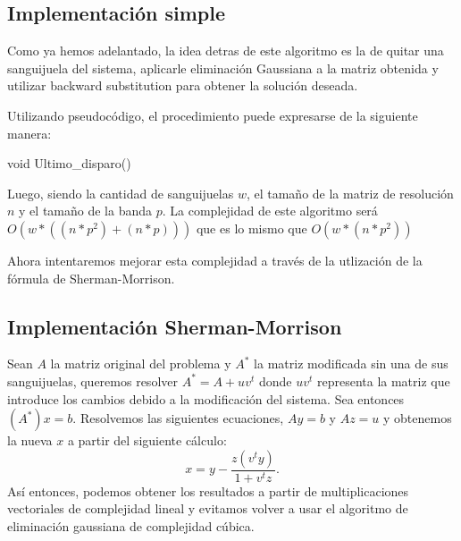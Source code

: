 \subsection{Implementación simple}

Como ya hemos adelantado, la idea detras de este algoritmo es la de quitar una sanguijuela del sistema, aplicarle eliminación Gaussiana a la matriz obtenida y utilizar backward substitution para obtener la solución deseada.

Utilizando pseudocódigo, el procedimiento puede expresarse de la siguiente manera:

\begin{algorithm}
\begin{algorithmic}[1]\parskip=1mm
\caption{void Ultimo\_disparo()}
\end{algorithmic}
\end{algorithm}

Luego, siendo la cantidad de sanguijuelas $w$, el tamaño de la matriz de resolución $n$ y el tamaño de la banda $p$. La complejidad de este algoritmo será $O(w*((n*p^2) + (n*p)) )$ que es lo mismo que $O(w*(n*p^2))$

Ahora intentaremos mejorar esta complejidad a través de la utlización de la fórmula de Sherman-Morrison.

\subsection{Implementación Sherman-Morrison}

Sean $A$ la matriz original del problema y $A^*$ la matriz modificada sin una de sus sanguijuelas, queremos resolver $A^* = A + uv^t$ donde $uv^t$ representa la matriz que introduce los cambios debido a la modificación del sistema. Sea entonces
$(A^*)x = b$. Resolvemos las siguientes ecuaciones, $Ay = b$ y $Az = u$ y obtenemos la nueva $x$ a partir del siguiente cálculo:
\begin{equation}
x = y - \frac{z(v^ty)}{1+v^tz}.
\end{equation}
Así entonces, podemos obtener los resultados a partir de multiplicaciones vectoriales de complejidad lineal y evitamos volver a usar el algoritmo de eliminación gaussiana de complejidad cúbica.
\\

